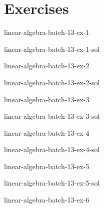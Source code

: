 \documentclass[preview]{standalone}
\begin{document}
\genpage

\section{Exercises}

\begin{snippetexercise}{linear-algebra-batch-13-ex-1}{}
    \todo
\end{snippetexercise}

\begin{snippetsolution}{linear-algebra-batch-13-ex-1-sol}{}
    \todo
\end{snippetsolution}

\begin{snippetexercise}{linear-algebra-batch-13-ex-2}{}
    \todo
\end{snippetexercise}

\begin{snippetsolution}{linear-algebra-batch-13-ex-2-sol}{}
    \todo
\end{snippetsolution}

\begin{snippetexercise}{linear-algebra-batch-13-ex-3}{}
    \todo
\end{snippetexercise}

\begin{snippetsolution}{linear-algebra-batch-13-ex-3-sol}{}
    \todo
\end{snippetsolution}

\begin{snippetexercise}{linear-algebra-batch-13-ex-4}{}
    \todo
\end{snippetexercise}

\begin{snippetsolution}{linear-algebra-batch-13-ex-4-sol}{}
    \todo
\end{snippetsolution}

\begin{snippetexercise}{linear-algebra-batch-13-ex-5}{}
    \todo
\end{snippetexercise}

\begin{snippetsolution}{linear-algebra-batch-13-ex-5-sol}{}
    \todo
\end{snippetsolution}

\begin{snippetexercise}{linear-algebra-batch-13-ex-6}{}
    \todo
\end{snippetexercise}
\end{document}

